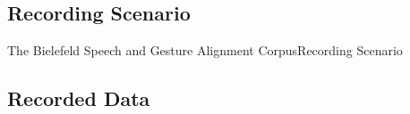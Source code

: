 \documentclass{beamer}
\begin{document}
		\subsection{Recording Scenario}
			\begin{frame}{The Bielefeld Speech and Gesture Alignment Corpus}{Recording Scenario}
				\begin{figure}
				\end{figure}
			\end{frame}
		
		\subsection{Recorded Data}
			
\end{document}

